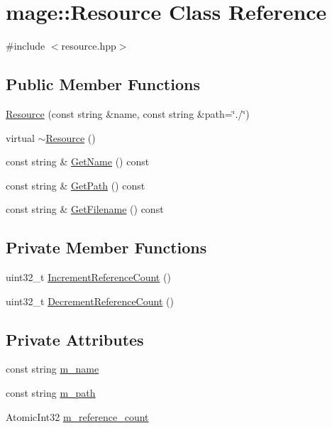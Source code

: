 \hypertarget{classmage_1_1_resource}{}\section{mage\+:\+:Resource Class Reference}
\label{classmage_1_1_resource}


{\ttfamily \#include $<$resource.\+hpp$>$}

\subsection*{Public Member Functions}
\begin{DoxyCompactItemize}
\item 
\hyperlink{classmage_1_1_resource_a7b4febc86646d51ac116732af01abcaf}{Resource} (const string \&name, const string \&path=\char`\"{}./\char`\"{})
\item 
virtual \hyperlink{classmage_1_1_resource_a80112db991a7dfd1dc0b24967981ac60}{$\sim$\+Resource} ()
\item 
const string \& \hyperlink{classmage_1_1_resource_a77713b0c74f8983afc2d42843afe8cbe}{Get\+Name} () const
\item 
const string \& \hyperlink{classmage_1_1_resource_a2ef6c6937947b56cbabc569e3a63ca71}{Get\+Path} () const
\item 
const string \& \hyperlink{classmage_1_1_resource_a1e5163aed4ec9f73c477df2fe7ca2c03}{Get\+Filename} () const
\end{DoxyCompactItemize}
\subsection*{Private Member Functions}
\begin{DoxyCompactItemize}
\item 
uint32\+\_\+t \hyperlink{classmage_1_1_resource_a828bf8678979bfa92f2d2df81b60c57f}{Increment\+Reference\+Count} ()
\item 
uint32\+\_\+t \hyperlink{classmage_1_1_resource_a80b053a65f76bcb61ce9a81478277fc0}{Decrement\+Reference\+Count} ()
\end{DoxyCompactItemize}
\subsection*{Private Attributes}
\begin{DoxyCompactItemize}
\item 
const string \hyperlink{classmage_1_1_resource_a93019b74e9665195f1af17c60b6d171a}{m\+\_\+name}
\item 
const string \hyperlink{classmage_1_1_resource_a983470902250a8d16b6d5d01c332804b}{m\+\_\+path}
\item 
Atomic\+Int32 \hyperlink{classmage_1_1_resource_a7b54e6436afe7128383ab19172878cd9}{m\+\_\+reference\+\_\+count}
\end{DoxyCompactItemize}
